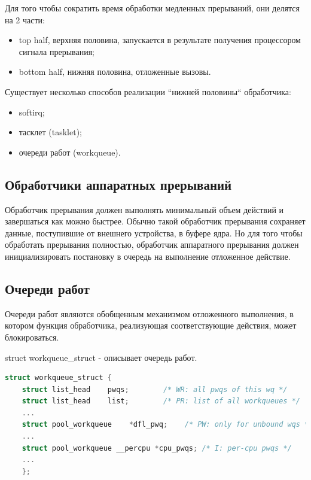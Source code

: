 Для того чтобы сократить время обработки медленных прерываний, они делятся на 2 части:

\begin{itemize}
	\item top half, верхняя половина, запускается в результате получения процессором сигнала прерывания;
	\item bottom half, нижняя половина, отложенные вызовы.
\end{itemize}

Существует несколько способов реализации “нижней половины“
обработчика: 
\begin{itemize}
	\item softirq;
	\item тасклет (tasklet);
	\item очереди работ (workqueue).
\end{itemize}

\subsection{Обработчики аппаратных прерываний}

Обработчик прерывания должен выполнять минимальный объем действий и завершаться как можно быстрее.
Обычно такой обработчик прерывания сохраняет данные, поступившие от внешнего устройства, в буфере ядра. 
Но для того чтобы обработать прерывания полностью, обработчик аппаратного прерывания должен 
инициализировать постановку в очередь на выполнение отложенное действие.

\subsection{Очереди работ}

Очереди работ являются обобщенным механизмом отложенного выполнения, в котором 
функция обработчика, реализующая соответствующие действия, может блокироваться.

struct workqueue\_struct - описывает очередь работ.

\begin{lstlisting}[language=c, label=some-code, caption=Структура workqueue\_struct]
struct workqueue_struct {
	struct list_head    pwqs;        /* WR: all pwqs of this wq */
	struct list_head    list;        /* PR: list of all workqueues */
	...
	struct pool_workqueue    *dfl_pwq;    /* PW: only for unbound wqs */
	...
	struct pool_workqueue __percpu *cpu_pwqs; /* I: per-cpu pwqs */
	...
	};
\end{lstlisting}

